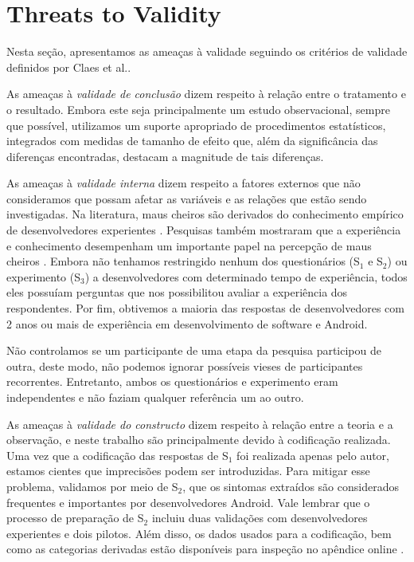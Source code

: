 \section{Threats to Validity}
\label{ameacas}

Nesta seção, apresentamos as ameaças à validade seguindo os critérios de validade definidos por Claes et al.\cite{Wohlin:00}.

As ameaças à \textit{validade de conclusão} dizem respeito à relação entre o tratamento e o resultado. Embora este seja principalmente um estudo observacional, sempre que possível, utilizamos um suporte apropriado de procedimentos estatísticos, integrados com medidas de tamanho de efeito que, além da significância das diferenças encontradas, destacam a magnitude de tais diferenças. 

As ameaças à \textit{validade interna} dizem respeito a fatores externos que não consideramos que possam afetar as variáveis e as relações que estão sendo investigadas. 
Na literatura, maus cheiros são derivados do conhecimento empírico de desenvolvedores experientes \cite{Refactoring:99, Riel:96, CleanCode:08, Webster:95}. Pesquisas também mostraram que a experiência e conhecimento desempenham um importante papel na percepção de maus cheiros \cite{Palomba_Do_2014, Taibi:17}. Embora não tenhamos restringido nenhum dos questionários (S$_1$ e S$_2$) ou experimento (S$_3$) a desenvolvedores com determinado tempo de experiência, todos eles possuíam perguntas que nos possibilitou avaliar a experiência dos respondentes. Por fim, obtivemos a maioria das respostas de desenvolvedores com 2 anos ou mais de experiência em desenvolvimento de software e Android.

Não controlamos se um participante de uma etapa da pesquisa participou de outra, deste modo, não podemos ignorar possíveis vieses de participantes recorrentes. Entretanto, ambos os questionários e experimento eram independentes e não faziam qualquer referência um ao outro.


As ameaças à \textit{validade do constructo} dizem respeito à relação entre a teoria e a observação, e neste trabalho são principalmente devido à codificação realizada. Uma vez que a codificação das respostas de S$_1$ foi realizada apenas pelo autor, estamos cientes que imprecisões podem ser introduzidas. Para mitigar esse problema, validamos por meio de S$_2$, que os sintomas extraídos são considerados frequentes e importantes por desenvolvedores Android. Vale lembrar que o processo de preparação de S$_2$ incluiu duas validações com desenvolvedores experientes e dois pilotos. Além disso, os dados usados para a codificação, bem como as categorias derivadas estão disponíveis para inspeção no apêndice online \cite{apendice}.

